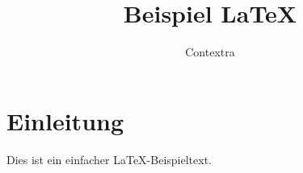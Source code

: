 \documentclass{article}
\title{Beispiel LaTeX}
\author{Contextra}
\begin{document}
\maketitle
\section{Einleitung}
Dies ist ein einfacher \LaTeX-Beispieltext.
\end{document}
